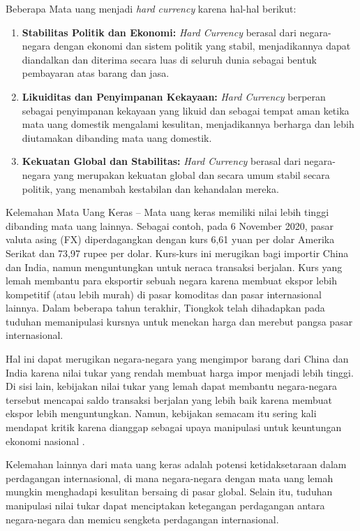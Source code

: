 \documentclass[12pt]{article}
\begin{document}
    Beberapa Mata uang menjadi \emph{hard currency} karena hal-hal \autocite{onlineshayla2022} berikut:

\begin{enumerate}
    \item \textbf{Stabilitas Politik dan Ekonomi:} \emph{Hard Currency} berasal dari negara-negara dengan ekonomi dan sistem politik yang stabil, menjadikannya dapat diandalkan dan diterima secara luas di seluruh dunia sebagai bentuk pembayaran atas barang dan jasa.

    \item \textbf{Likuiditas dan Penyimpanan Kekayaan:} \emph{Hard Currency} berperan sebagai penyimpanan kekayaan yang likuid dan sebagai tempat aman ketika mata uang domestik mengalami kesulitan, menjadikannya berharga dan lebih diutamakan dibanding mata uang domestik.

    \item \textbf{Kekuatan Global dan Stabilitas:} \emph{Hard Currency} berasal dari negara-negara yang merupakan kekuatan global dan secara umum stabil secara politik, yang menambah kestabilan dan kehandalan mereka.

\end{enumerate}

Kelemahan Mata Uang Keras --
Mata uang keras memiliki nilai lebih tinggi dibanding mata uang lainnya. Sebagai contoh, pada 6 November 2020, pasar valuta asing (FX) diperdagangkan dengan kurs 6,61 yuan per dolar Amerika Serikat dan 73,97 rupee per dolar. Kurs-kurs ini merugikan bagi importir China dan India, namun menguntungkan untuk neraca transaksi berjalan. Kurs yang lemah membantu para eksportir sebuah negara karena membuat ekspor lebih kompetitif (atau lebih murah) di pasar komoditas dan pasar internasional lainnya. Dalam beberapa tahun terakhir, Tiongkok telah dihadapkan pada tuduhan memanipulasi kursnya untuk menekan harga dan merebut pangsa pasar internasional.

Hal ini dapat merugikan negara-negara yang mengimpor barang dari China dan India karena nilai tukar yang rendah membuat harga impor menjadi lebih tinggi. Di sisi lain, kebijakan nilai tukar yang lemah dapat membantu negara-negara tersebut mencapai saldo transaksi berjalan yang lebih baik karena membuat ekspor lebih menguntungkan. Namun, kebijakan semacam itu sering kali mendapat kritik karena dianggap sebagai upaya manipulasi untuk keuntungan ekonomi nasional \autocite{chenCurrency2023}.

Kelemahan lainnya dari mata uang keras adalah potensi ketidaksetaraan dalam perdagangan internasional, di mana negara-negara dengan mata uang lemah mungkin menghadapi kesulitan bersaing di pasar global. Selain itu, tuduhan manipulasi nilai tukar dapat menciptakan ketegangan perdagangan antara negara-negara dan memicu sengketa perdagangan internasional.
\end{document}
